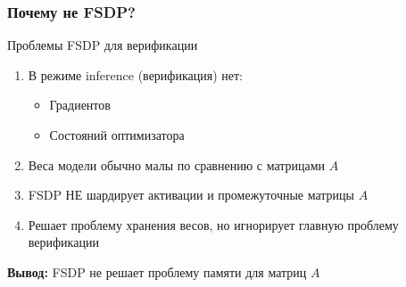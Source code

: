 \begin{frame}
\frametitle{Почему не FSDP?}

\begin{alertblock}{Проблемы FSDP для верификации}
\begin{enumerate}
    \item В режиме inference (верификация) нет:
    \begin{itemize}
        \item Градиентов
        \item Состояний оптимизатора
    \end{itemize}
    \item Веса модели обычно малы по сравнению с матрицами $A$
    \item FSDP НЕ шардирует активации и промежуточные матрицы $A$
    \item Решает проблему хранения весов, но игнорирует главную проблему верификации
\end{enumerate}
\end{alertblock}

\vspace{0.3cm}

\textbf{Вывод:} FSDP не решает проблему памяти для матриц $A$

\end{frame}
